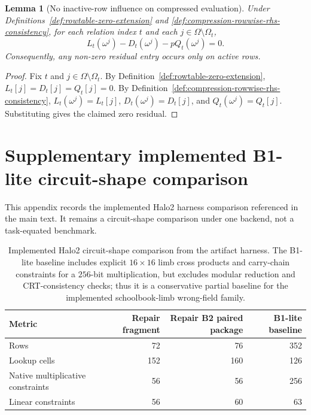 ﻿\documentclass[11pt]{article}
\newtheorem{lemma}[theorem]{Lemma}
\begin{document}
\begin{lemma}[No inactive-row influence on compressed evaluation]
\label{lem:no-inactive-row-influence}
Under Definitions~\ref{def:rowtable-zero-extension} and
\ref{def:compression-rowwise-rhs-consistency}, for each relation index \(t\) and
each \(j\in\Omega\setminus\Omega_t\),
\[
L_t(\omega^j)-D_t(\omega^j)-pQ_t(\omega^j)=0.
\]
Consequently, any non-zero residual entry occurs only on active rows.
\end{lemma}

\begin{proof}
Fix \(t\) and \(j\in\Omega\setminus\Omega_t\). By
Definition~\ref{def:rowtable-zero-extension}, \(L_t[j]=D_t[j]=Q_t[j]=0\). By
Definition~\ref{def:compression-rowwise-rhs-consistency},
\(L_t(\omega^j)=L_t[j]\), \(D_t(\omega^j)=D_t[j]\), and \(Q_t(\omega^j)=Q_t[j]\).
Substituting gives the claimed zero residual.
\end{proof}

\section{Supplementary implemented B1-lite circuit-shape comparison}
\label{app:b1lite-supplement}
This appendix records the implemented Halo2 harness comparison referenced in
the main text. It remains a circuit-shape comparison under one backend, not a
task-equated benchmark.

\begin{table}[t]
\centering
\small
\setlength{\tabcolsep}{6pt}
\begin{tabular}{|l|r|r|r|}
\hline
Metric & Repair fragment & Repair B2 paired package & B1-lite baseline \\
\hline
Rows & 72 & 76 & 352 \\
Lookup cells & 152 & 160 & 126 \\
Native multiplicative constraints & 56 & 56 & 256 \\
Linear constraints & 56 & 60 & 63 \\
\hline
\end{tabular}
\caption{Implemented Halo2 circuit-shape comparison from the artifact harness.
The B1-lite baseline includes explicit \(16\times16\) limb cross products and
carry-chain constraints for a \(256\)-bit multiplication, but excludes modular
reduction and CRT-consistency checks; thus it is a conservative partial
baseline for the implemented schoolbook-limb wrong-field family.}
\label{tab:b1lite-implemented-comparison-appendix}
\end{table}
\end{document}
